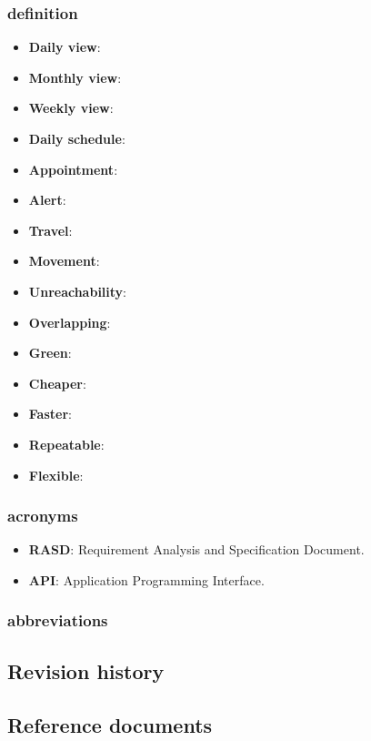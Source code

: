\subsubsection{definition}
\begin{itemize}
	\item \textbf{Daily view}:  
	\item \textbf{Monthly view}:
	\item \textbf{Weekly view}:
	\item \textbf{Daily schedule}:
	\item \textbf{Appointment}: 
	\item \textbf{Alert}:
	\item \textbf{Travel}:
	\item \textbf{Movement}:
	\item \textbf{Unreachability}:
	\item \textbf{Overlapping}:
	\item \textbf{Green}:
	\item \textbf{Cheaper}:
	\item \textbf{Faster}:
	\item \textbf{Repeatable}:
	\item \textbf{Flexible}:
\end{itemize}
\subsubsection{acronyms}
\begin{itemize}
	\item \textbf{RASD}: Requirement Analysis and Specification Document.
	\item \textbf{API}: Application Programming Interface.
\end{itemize}
\subsubsection{abbreviations}

\subsection{Revision history}
\subsection{Reference documents}
